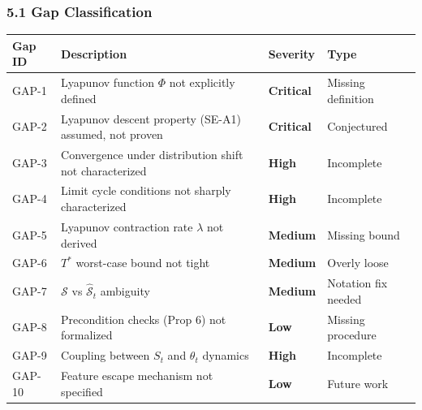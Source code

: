 \documentclass[
  12pt,
]{article}
\begin{document}
\subsubsection{5.1 Gap Classification}\label{gap-classification}

\begin{longtable}[]{@{}
  >{\raggedright\arraybackslash}p{}
  >{\raggedright\arraybackslash}p{}
  >{\raggedright\arraybackslash}p{}
  >{\raggedright\arraybackslash}p{}@{}}
\toprule\noalign{}
\begin{minipage}[b]{\linewidth}\raggedright
Gap ID
\end{minipage} & \begin{minipage}[b]{\linewidth}\raggedright
Description
\end{minipage} & \begin{minipage}[b]{\linewidth}\raggedright
Severity
\end{minipage} & \begin{minipage}[b]{\linewidth}\raggedright
Type
\end{minipage} \\
\midrule\noalign{}
\endhead
\bottomrule\noalign{}
\endlastfoot
GAP-1 & Lyapunov function \(\Phi\) not explicitly defined &
\textbf{Critical} & Missing definition \\
GAP-2 & Lyapunov descent property (SE-A1) assumed, not proven &
\textbf{Critical} & Conjectured \\
GAP-3 & Convergence under distribution shift not characterized &
\textbf{High} & Incomplete \\
GAP-4 & Limit cycle conditions not sharply characterized & \textbf{High}
& Incomplete \\
GAP-5 & Lyapunov contraction rate \(\lambda\) not derived &
\textbf{Medium} & Missing bound \\
GAP-6 & \(T^*\) worst-case bound not tight & \textbf{Medium} & Overly
loose \\
GAP-7 & \(\mathcal{S}\) vs \(\hat{\mathcal{S}}_t\) ambiguity &
\textbf{Medium} & Notation fix needed \\
GAP-8 & Precondition checks (Prop 6) not formalized & \textbf{Low} &
Missing procedure \\
GAP-9 & Coupling between \(S_t\) and \(\theta_t\) dynamics &
\textbf{High} & Incomplete \\
GAP-10 & Feature escape mechanism not specified & \textbf{Low} & Future
work \\
\end{longtable}
\end{document}

